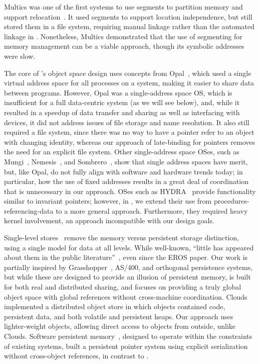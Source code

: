 Multics was one of the first systems to use segments to partition memory and
support relocation~\cite{bensoussan:sosp69,daley:cacm68}. It used segments to
support location independence, but still stored them in a file system, requiring manual linkage
rather than the automated linkage in \Twizzler. Nonetheless, Multics demonstrated that the use of
segmenting for memory management can be a viable approach, though its
symbolic addresses were slow.

The core of \Twizzler's object space design uses concepts
from Opal~\cite{chase:tocs94}, which used a single virtual
address space for all processes on a system, making it easier to share
data between programs. However, Opal was a single-address space OS, which is insufficient for
a full data-centric system (as we will see below),
and, while it resulted in a speedup of data transfer and sharing as well as interfacing with
devices, it did not address issues of file storage and name resolution. It also
still required a file
system, since there was no way to have a pointer refer to an object with changing identity,
whereas our approach
of late-binding for pointers
removes the need for an explicit file system.  Other single-address space
OSes, such as Mungi~\cite{heiser:scse9314},
Nemesis~\cite{roscoe:osr94}, and Sombrero~\cite{skousen:ipccc99}, show that
single address spaces have merit, but, like Opal, do not fully align with software and hardware trends today; in particular, how the use of fixed addresses
results in a great deal of coordination that is unnecessary in our approach.
OSes such as HYDRA~\cite{wulf:cacm74} provide functionality similar to invariant pointers;
however, in \Twizzler, we extend their use from procedures-referencing-data to
a more general approach. Furthermore, they required
heavy kernel involvement, an approach incompatible with
our design goals.

Single-level stores~\cite{shapiro:usenix02,shekita:uwtr956,dearle:cs94} remove the
memory versus persistent storage distinction, using a single model for data
at all levels. While well-known,
``little has appeared about them in the public
literature''~\cite{shapiro:usenix02}, even since the EROS paper.
Our work is partially inspired by Grasshopper~\cite{dearle:cs94}, AS/400, and orthogonal persistence systems,
but while these are designed to provide an illusion of persistent
memory, \Twizzler is built for both real \NVM and distributed sharing, and focuses on providing a truly global object space with
global references without cross-machine coordination.
Clouds~\cite{dasgupta:computer91} implemented a distributed object store in
which objects contained code, persistent data, and both volatile and
persistent heaps. Our approach uses lighter-weight objects, allowing direct
access to objects from outside, unlike Clouds. Software persistent
memory~\cite{guerra:atc12}, designed to operate within the constraints
of existing systems, built a persistent pointer system using explicit
serialization without cross-object references, in contrast to \Twizzler.

